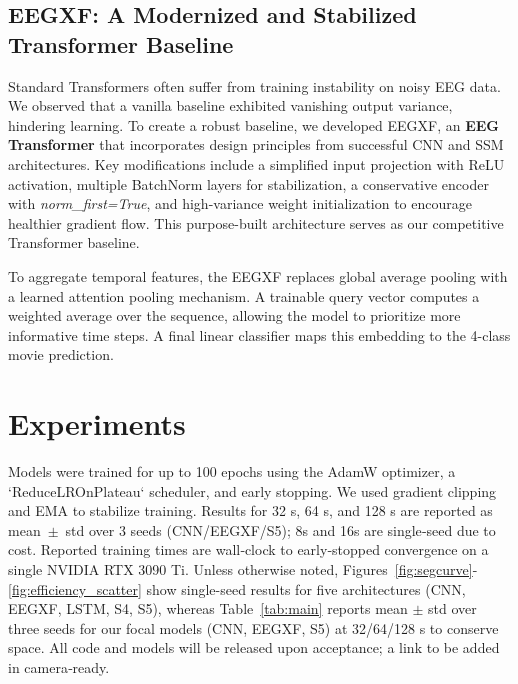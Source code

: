 \documentclass{article}
\newcommand{\eegtrans}{EEGXF}
\begin{document}
\subsection{\eegtrans{}: A Modernized and Stabilized Transformer Baseline} \label{sec:\eegtrans}

Standard Transformers often suffer from training instability on noisy EEG data. We observed that a vanilla baseline exhibited vanishing output variance, hindering learning. To create a robust baseline, we developed \eegtrans{}, an \textbf{EEG Transformer} that incorporates design principles from successful CNN and SSM architectures. Key modifications include a simplified input projection with ReLU activation, multiple BatchNorm layers for stabilization, a conservative encoder with \textit{norm\_first=True}, and high-variance weight initialization to encourage healthier gradient flow. This purpose-built architecture serves as our competitive Transformer baseline.

To aggregate temporal features, the \eegtrans{} replaces global average pooling with a learned attention pooling mechanism. A trainable query vector computes a weighted average over the sequence, allowing the model to prioritize more informative time steps.
A final linear classifier maps this embedding to the 4-class movie prediction.




\section{Experiments}
\label{sec:exp}

Models were trained for up to 100 epochs using the AdamW optimizer, a `ReduceLROnPlateau` scheduler, and early stopping. We used gradient clipping and EMA to stabilize training. %
Results for 32 s, 64 s, and 128 s are reported as mean~$\pm$~std over 3 seeds (CNN/\eegtrans{}/S5); 8s and 16s are single‑seed due to cost.
Reported training times are wall‑clock to early‑stopped convergence on a single NVIDIA RTX 3090 Ti. %
Unless otherwise noted, Figures~\ref{fig:segcurve}-\ref{fig:efficiency_scatter} show single-seed results for five architectures (CNN, \eegtrans{}, LSTM, S4, S5), whereas Table~\ref{tab:main} reports mean $\pm$ std over three seeds for our focal models (CNN, \eegtrans{}, S5) at 32/64/128 s to conserve space.
All code and models will be released upon acceptance; a link to be added in camera‑ready.
\end{document}
